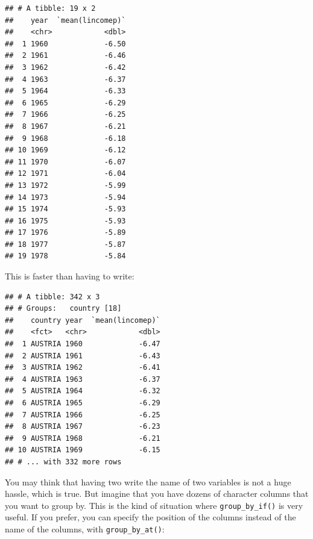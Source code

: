 \documentclass[]{gitbook}
\newenvironment{Shaded}{\begin{snugshade}}{\end{snugshade}}
\newcommand{\DecValTok}[1]{\textcolor[rgb]{0.00,0.00,0.81}{#1}}
\newcommand{\KeywordTok}[1]{\textcolor[rgb]{0.13,0.29,0.53}{\textbf{#1}}}
\newcommand{\NormalTok}[1]{#1}
\newcommand{\OperatorTok}[1]{\textcolor[rgb]{0.81,0.36,0.00}{\textbf{#1}}}
\newcommand{\StringTok}[1]{\textcolor[rgb]{0.31,0.60,0.02}{#1}}
\begin{document}
\begin{verbatim}
## # A tibble: 19 x 2
##    year  `mean(lincomep)`
##    <chr>            <dbl>
##  1 1960             -6.50
##  2 1961             -6.46
##  3 1962             -6.42
##  4 1963             -6.37
##  5 1964             -6.33
##  6 1965             -6.29
##  7 1966             -6.25
##  8 1967             -6.21
##  9 1968             -6.18
## 10 1969             -6.12
## 11 1970             -6.07
## 12 1971             -6.04
## 13 1972             -5.99
## 14 1973             -5.94
## 15 1974             -5.93
## 16 1975             -5.93
## 17 1976             -5.89
## 18 1977             -5.87
## 19 1978             -5.84
\end{verbatim}

This is faster than having to write:

\begin{Shaded}
\end{Shaded}

\begin{verbatim}
## # A tibble: 342 x 3
## # Groups:   country [18]
##    country year  `mean(lincomep)`
##    <fct>   <chr>            <dbl>
##  1 AUSTRIA 1960             -6.47
##  2 AUSTRIA 1961             -6.43
##  3 AUSTRIA 1962             -6.41
##  4 AUSTRIA 1963             -6.37
##  5 AUSTRIA 1964             -6.32
##  6 AUSTRIA 1965             -6.29
##  7 AUSTRIA 1966             -6.25
##  8 AUSTRIA 1967             -6.23
##  9 AUSTRIA 1968             -6.21
## 10 AUSTRIA 1969             -6.15
## # ... with 332 more rows
\end{verbatim}

You may think that having two write the name of two variables is not a huge hassle, which is true.
But imagine that you have dozens of character columns that you want to group by. This is the kind
of situation where \texttt{group\_by\_if()} is very useful. If you prefer, you can specify the position of
the columns instead of the name of the columns, with \texttt{group\_by\_at()}:

\begin{Shaded}
\end{Shaded}
\end{document}
